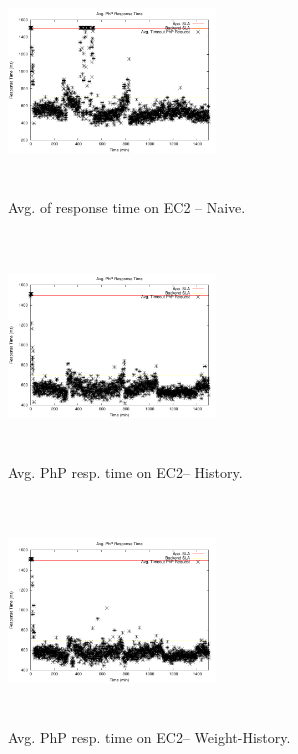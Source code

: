 \begin{figure}
\begin{center}
\includegraphics[width=0.49\textwidth, height=6cm]{./images/heterogeneous/avgTimeout_PhP_naive}
\end{center}
\label{naiveEC2}
\caption{Avg. of  response time on EC2 -- Naive.}
\end{figure}


\begin{figure}
\begin{center}
\includegraphics[width=0.49\textwidth, height=6cm]{./images/heterogeneous/avgTimeout_PhP_history}
\end{center}
\label{historyEC2}
\caption{Avg. PhP resp. time on EC2-- History.}
\end{figure}

\begin{figure}
\begin{center}
\includegraphics[width=0.49\textwidth, height=6cm]{./images/heterogeneous/avgTimeout_PhP_weightHistory}
\end{center}
\label{historyWeightEC2}
\caption{Avg. PhP resp. time on EC2-- Weight-History.}
\end{figure}

